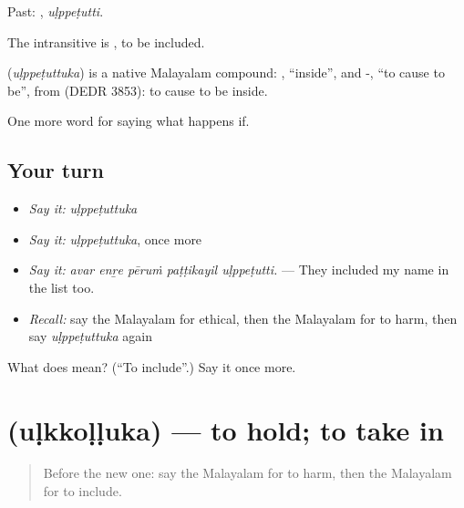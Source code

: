 Past: , \emph{uḷppeṭutti}.

The intransitive is , to be included.

\begin{cousinweb}
\textbf{} (\emph{uḷppeṭuttuka}) is a native Malayalam compound: , \textquotedblleft{}inside\textquotedblright{}, and -, \textquotedblleft{}to cause to be\textquotedblright{}, from  (DEDR 3853): to cause to be inside.
\end{cousinweb}

\begin{grammarlens}[title={What you've built}]
One more word for saying what happens if.
\end{grammarlens}

\subsection*{Your turn}
\begin{itemize}
\raggedright
  \item \emph{Say it:} \emph{uḷppeṭuttuka}
  \item \emph{Say it:} \emph{uḷppeṭuttuka}, once more
  \item \emph{Say it:} \emph{avar enṟe pēruṁ paṭṭikayil uḷppeṭutti.} — They included my name in the list too.
  \item \emph{Recall:} say the Malayalam for ethical, then the Malayalam for to harm, then say \emph{uḷppeṭuttuka} again
\end{itemize}

\begin{tcolorbox}[breakable,colback=teal!4,colframe=teal!35!black,title={Before you move on}]
What does  mean? (\textquotedblleft{}To include\textquotedblright{}.) Say it once more.
\end{tcolorbox}
\section[\texorpdfstring{\ml{ഉൾക്കൊള്ളുക} (uḷkkoḷḷuka)}{ഉൾക്കൊള്ളുക (uḷkkoḷḷuka)}]{ (uḷkkoḷḷuka) — to hold; to take in}

\label{lesson:ML-C456-ulkkolluka}



\begin{quote}
Before the new one: say the Malayalam for to harm, then the Malayalam for to include.
\end{quote}

